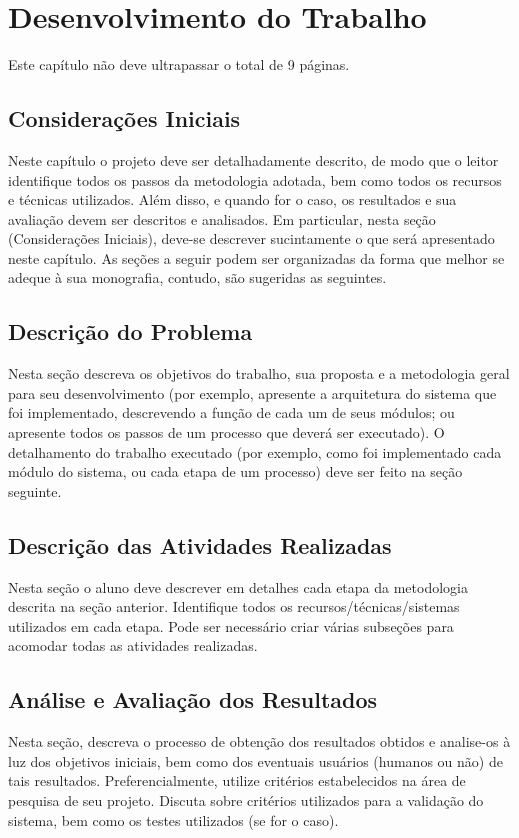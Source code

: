 \chapter{Desenvolvimento do Trabalho}

Este capítulo não deve ultrapassar o total de 9 páginas.

\section{Considerações Iniciais}
Neste capítulo o projeto deve ser detalhadamente descrito, de modo que
o leitor identifique todos os  passos da metodologia adotada, bem como
todos os  recursos e técnicas utilizados.  Além disso, e quando  for o
caso, os resultados e sua  avaliação devem ser descritos e analisados.
Em particular, nesta seção (Considerações Iniciais), deve-se descrever
sucintamente  o que  será  apresentado neste  capítulo.   As seções  a
seguir  podem ser  organizadas da  forma que  melhor se  adeque à  sua
monografia, contudo, são sugeridas as seguintes.

\section{Descrição do Problema}

Nesta  seção descreva  os  objetivos  do trabalho,  sua  proposta e  a
metodologia geral  para seu desenvolvimento (por  exemplo, apresente a
arquitetura do sistema  que foi implementado, descrevendo  a função de
cada um de  seus módulos; ou apresente todos os  passos de um processo
que deverá ser  executado). O detalhamento do  trabalho executado (por
exemplo, como foi  implementado cada módulo do sistema,  ou cada etapa
de um processo) deve ser feito na seção seguinte.

\section{Descrição das Atividades Realizadas}
Nesta  seção  o  aluno  deve  descrever  em  detalhes  cada  etapa  da
metodologia  descrita   na  seção   anterior.  Identifique   todos  os
recursos/técnicas/sistemas   utilizados  em   cada  etapa.   Pode  ser
necessário criar  várias subseções  para acomodar todas  as atividades
realizadas.

\section{Análise e Avaliação dos Resultados}
Nesta seção, descreva o processo  de obtenção dos resultados obtidos e
analise-os  à  luz dos  objetivos  iniciais,  bem como  dos  eventuais
usuários  (humanos  ou  não) de  tais  resultados.  Preferencialmente,
utilize   critérios  estabelecidos   na  área   de  pesquisa   de  seu
projeto.  Discuta  sobre  critérios  utilizados para  a  validação  do
sistema, bem como os testes utilizados (se for o caso).

